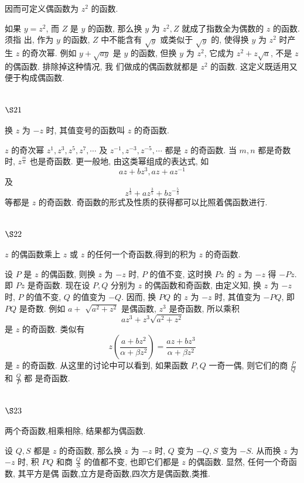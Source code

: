 因而可定义偶函数为 $z^{2}$ 的函数.

如果 $y=z^{2}$, 而 $Z$ 是 $y$ 的函数, 那么换 $y$ 为 $z^{2}, Z$ 就成了指数全为偶数的 $z$ 的函数. 须指 出, 作为 $y$ 的函数, $Z$ 中不能含有 $\sqrt{y}$ 或类似于 $\sqrt{y}$ 的, 使得换 $y$ 为 $z^{2}$ 时产生 $z$ 的奇次幂. 例如 $y+\sqrt{a y}$ 是 $y$ 的函数, 但换 $y$ 为 $z^{2}$, 它成为 $z^{2}+z \sqrt{a}$, 不是 $z$ 的偶函数. 排除掉这种情况, 我 们做成的偶函数就都是 $z^{2}$ 的函数. 这定义既适用又便于构成偶函数.

\section{$\S 21$}

换 $z$ 为 $-z$ 时, 其值变号的函数叫 $z$ 的奇函数.

$z$ 的奇次幂 $z^{1}, z^{3}, z^{5}, z^{7}, \cdots$ 及 $z^{-1}, z^{-3}, z^{-5}, \cdots$ 都是 $z$ 的奇函数. 当 $m, n$ 都是奇数时, $z^{\frac{m}{n}}$ 也是奇函数. 更一般地, 由这类幂组成的表达式, 如
\[
a z+b z^{3}, a z+a z^{-1}
\]
及
\[
z^{\frac{1}{3}}+a z^{\frac{3}{5}}+b z^{-\frac{5}{3}}
\]
等都是 $z$ 的奇函数. 奇函数的形式及性质的获得都可以比照着偶函数进行.

\section{$\S 22$}

$z$ 的偶函数乘上 $z$ 或 $z$ 的任何一个奇函数,得到的积为 $z$ 的奇函数.

设 $P$ 是 $z$ 的偶函数, 则换 $z$ 为 $-z$ 时, $P$ 的值不变, 这时换 $P z$ 的 $z$ 为 $-z$ 得 $-P z$. 即 $P z$ 是奇函数. 现在设 $P, Q$ 分别为 $z$ 的偶函数和奇函数, 由定义知, 换 $z$ 为 $-z$ 时, $P$ 的值不变, $Q$ 的值变为 $-Q$. 因而, 换 $P Q$ 的 $z$ 为 $-z$ 时, 其值变为 $-P Q$, 即 $P Q$ 是奇数. 例如 $a+$ $\sqrt{a^{2}+z^{2}}$ 是偶函数, $z^{3}$ 是奇函数, 所以乘积
\[
a z^{3}+z^{3} \sqrt{a^{2}+z^{2}}
\]
是 $z$ 的奇函数. 类似有
\[
z\left(\frac{a+b z^{2}}{\alpha+\beta z^{2}}\right)=\frac{a z+b z^{3}}{\alpha+\beta z^{2}}
\]
是 $z$ 的奇函数. 从这里的讨论中可以看到, 如果函数 $P, Q$ 一奇一偶, 则它们的商 $\frac{P}{Q}$ 和 $\frac{Q}{P}$ 都 是奇函数.

\section{$\S 23$}

两个奇函数,相乘相除, 结果都为偶函数.

设 $Q, S$ 都是 $z$ 的奇函数, 那么换 $z$ 为 $-z$ 时, $Q$ 变为 $-Q, S$ 变为 $-S$. 从而换 $z$ 为 $-z$ 时, 积 $P Q$ 和商 $\frac{Q}{S}$ 的值都不变, 也即它们都是 $z$ 的偶函数. 显然, 任何一个奇函数, 其平方是偶 函数,立方是奇函数,四次方是偶函数,类推.

